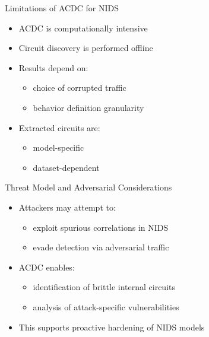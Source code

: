 \documentclass{beamer}
\begin{document}
	\begin{frame}{Limitations of ACDC for NIDS}
		\begin{itemize}
			\item ACDC is computationally intensive
			\item Circuit discovery is performed offline
			\item Results depend on:
			\begin{itemize}
				\item choice of corrupted traffic
				\item behavior definition granularity
			\end{itemize}
			\item Extracted circuits are:
			\begin{itemize}
				\item model-specific
				\item dataset-dependent
			\end{itemize}
		\end{itemize}
	\end{frame}
	
	\begin{frame}{Threat Model and Adversarial Considerations}
		\begin{itemize}
			\item Attackers may attempt to:
			\begin{itemize}
				\item exploit spurious correlations in NIDS
				\item evade detection via adversarial traffic
			\end{itemize}
			\item ACDC enables:
			\begin{itemize}
				\item identification of brittle internal circuits
				\item analysis of attack-specific vulnerabilities
			\end{itemize}
			\item This supports proactive hardening of NIDS models
		\end{itemize}
	\end{frame}
	
\end{document}
